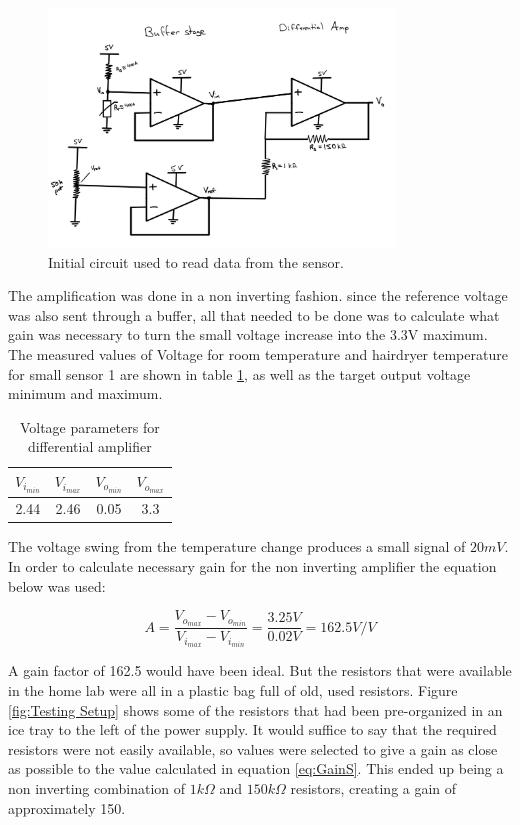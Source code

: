 \documentclass[12pt,a4paper]{report}
\begin{document}
\begin{figure}[h!]
    \centering
    \includegraphics[height = 2.5in]{Images/initial_circuit.png}
    \caption{Initial circuit used to read data from the sensor.}
    \label{fig:InitialCuircuit}
\end{figure}

The amplification was done in a non inverting fashion. since the reference voltage was also sent through a buffer, all that needed to be done was to calculate what gain was necessary to turn the small voltage increase into the 3.3V maximum. The measured values of Voltage for room temperature and hairdryer temperature for small sensor 1 are shown in table \ref{tab:DiffAmpParams}, as well as the target output voltage minimum and maximum.

\begin{table}[h!]
    \centering
    \caption{Voltage parameters for differential amplifier}
    \label{tab:DiffAmpParams}
    \begin{tabular}{|c|c|c|c|}
        \hline
        $V_{i_{min}}$ & $V_{i_{max}}$ & $V_{o_{min}}$ & $V_{o_{max}}$\\
        \hline
        2.44 & 2.46 & 0.05 & 3.3 \\
        \hline
    \end{tabular}
\end{table}

The voltage swing from the temperature change produces a small signal of $20mV$. In order to calculate necessary gain for the non inverting amplifier the equation below was used:

\begin{equation}\label{eq:GainS}
    A = \frac{V_{o_{max}}-V_{o_{min}}}{V_{i_{max}}-V_{i_{min}}} = \frac{3.25V}{0.02V} = 162.5 V/V
\end{equation}

 A gain factor of 162.5 would have been ideal. But the resistors that were available in the home lab were all in a plastic bag full of old, used resistors. Figure \ref{fig:Testing Setup} shows some of the resistors that had been pre-organized in an ice tray to the left of the power supply. It would suffice to say that the required resistors were not easily available, so values were selected to give a gain as close as possible to the value calculated in equation \ref{eq:GainS}. This ended up being a non inverting combination of $1k\Omega$ and $150k\Omega$ resistors, creating a gain of approximately 150.\par
 
\end{document}
